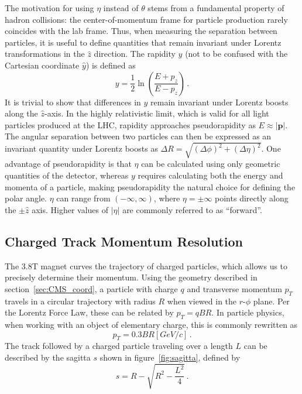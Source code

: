 The motivation for using $\eta$ instead of $\theta$ stems from a fundamental property of hadron collisions: the center-of-momentum frame for particle production rarely coincides with the lab frame. Thus, when measuring the separation between particles, it is useful to define quantities that remain invariant under Lorentz transformations in the $\hat{z}$ direction. The rapidity $y$ (not to be confused with the Cartesian coordinate $\hat{y}$) is defined as
\begin{equation}
	y=\frac{1}{2}\ln\left(\frac{E+p_{z}}{E-p_{z}}\right)\,.
\end{equation}
It is trivial to show that differences in $y$ remain invariant under Lorentz boosts along the $\hat{z}$-axis. In the highly relativistic limit, which is valid for all light particles produced at the LHC, rapidity approaches pseudorapidity as $E\approx|\mathbf{p}|$. The angular separation between two particles can then be expressed as an invariant quantity under Lorentz boosts as $\Delta R=\sqrt{\left(\Delta\phi\right)^2+\left(\Delta\eta\right)^2}$. One advantage of pseudorapidity is that $\eta$ can be calculated using only geometric quantities of the detector, whereas $y$ requires calculating both the energy and momenta of a particle, making pseudorapidity the natural choice for defining the polar angle. $\eta$ can range from $\left(-\infty, \infty\right)$, where $\eta=\pm\infty$ points directly along the $\pm\hat{z}$ axis. Higher values of $\left|\eta\right|$ are commonly referred to as ``forward''.

\subsection{Charged Track Momentum Resolution} \label{sec:CMS_sagitta}
The 3.8\unit{\tesla} magnet curves the trajectory of charged particles, which allows us to precisely determine their momentum. Using the geometry described in section~\ref{sec:CMS_coord}, a particle with charge $q$ and transverse momentum $p_T$ travels in a circular trajectory with radius $R$ when viewed in the $r$-$\phi$ plane. Per the Lorentz Force Law, these can be related by $p_{T} = qBR$. In particle physics, when working with an object of elementary charge, this is commonly rewritten as
\begin{equation}
	\label{eq:pt03br}
	p_{T} = 0.3BR\unit{[GeV/c]}\,.
\end{equation}
The track followed by a charged particle traveling over a length $L$ can be described by the sagitta $s$ shown in figure~\ref{fig:sagitta}, defined by
\begin{equation} \label{eq:sagitta}
	s=R-\sqrt{R^2-\frac{L^2}{4}}\,.
\end{equation}

